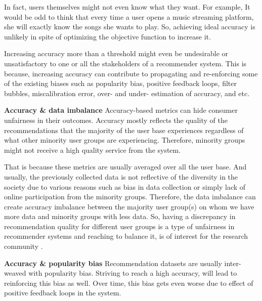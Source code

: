In fact, users themselves might not even know what they want. For example, It would be odd to think that every time a user opens a music streaming platform, she will exactly know the songs she wants to play. So, achieving ideal accuracy is unlikely in spite of optimizing the objective function to increase it.


Increasing accuracy more than a threshold might even be undesirable or unsatisfactory to one or all the stakeholders of a recommender system. This is because, increasing accuracy can contribute to propagating and re-enforcing some of the existing biases such as popularity bias, positive feedback loops, filter bubbles, miscalibration error, over- and under- estimation of accuracy, and etc. 


\textbf{Accuracy \& data imbalance}
Accuracy-based metrics can hide consumer unfairness in their outcomes. Accuracy mostly reflects the quality of the recommendations that the majority of the user base experiences regardless of what other minority user groups are experiencing. Therefore, minority groups might not receive a high quality service from the system. 

That is because these metrics are usually averaged over all the user base. And usually, the previously collected data is not reflective of the diversity in the society due to various reasons such as bias in data collection or simply lack of online participation from the minority groups. Therefore, the data imbalance can create accuracy imbalance between the majority user group(s) on whom we have more data and minority groups with less data. So, having a discrepancy in recommendation quality for different user groups is a type of unfairness  in recommender systems and reaching to balance it, is of interest for the research community .


\textbf{Accuracy \& popularity bias}
Recommendation datasets are usually inter-weaved with popularity bias. Striving to reach a high accuracy, will lead to reinforcing this bias as well. Over time, this bias gets even worse due to effect of positive feedback loops in the system.

